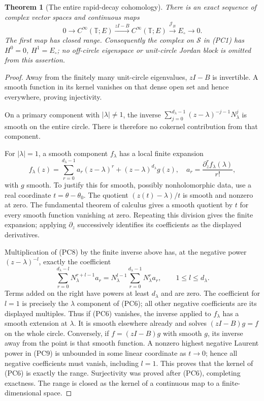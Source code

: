 \documentclass[11pt,a4paper]{article}
\newtheorem{theorem}{Theorem}[section]
\theoremstyle{definition}\newtheorem{definition}[theorem]{Definition}
\begin{document}
\begin{theorem}[The entire rapid-decay cohomology]
\label{thm:rapid-prime-cohomology}
There is an exact sequence of complex vector spaces and continuous maps
\[
 0\longrightarrow C^\infty(\mathbb T;E)
 \xrightarrow{zI-B} C^\infty(\mathbb T;E)
 \xrightarrow{\mathcal J_B}E_\circ\longrightarrow0.
 \tag{PC7}
\]
The first map has closed range. Consequently the complex on
$\mathscr S$ in (PC1) has $H^0=0$, $H^1=E_\circ$; no off-circle
eigenspace or unit-circle Jordan block is omitted from this assertion.
\end{theorem}
\begin{proof}
Away from the finitely many unit-circle eigenvalues, $zI-B$ is
invertible. A smooth function in its kernel vanishes on that dense
open set and hence everywhere, proving injectivity.

On a primary component with $|\lambda|\ne1$, the inverse
$\sum_{j=0}^{d_\lambda-1}(z-\lambda)^{-j-1}N_\lambda^j$
is smooth on the entire circle. There is therefore no cokernel
contribution from that component.

For $|\lambda|=1$, a smooth component $f_\lambda$ has a local finite
expansion
\[
 f_\lambda(z)=\sum_{r=0}^{d_\lambda-1}a_r(z-\lambda)^r
           +(z-\lambda)^{d_\lambda}g(z),
 \quad a_r=\frac{\partial_z^rf_\lambda(\lambda)}{r!},
 \tag{PC8}
\]
with $g$ smooth. To justify this for smooth, possibly nonholomorphic
data, use a real coordinate $t=\theta-\theta_0$. The quotient
$(z(t)-\lambda)/t$ is smooth and nonzero at zero. The fundamental
theorem of calculus gives a smooth quotient by $t$ for every smooth
function vanishing at zero. Repeating this division gives the finite
expansion; applying $\partial_z$ successively identifies its
coefficients as the displayed derivatives.

Multiplication of (PC8) by the finite inverse above has, at the
negative power $(z-\lambda)^{-l}$, exactly the coefficient
\[
 \sum_{r=0}^{d_\lambda-l}N_\lambda^{r+l-1}a_r
  =N_\lambda^{l-1}\sum_{r=0}^{d_\lambda-1}N_\lambda^r a_r,
 \qquad 1\le l\le d_\lambda.
 \tag{PC9}
\]
Terms added on the right have powers at least $d_\lambda$ and are
zero. The coefficient for $l=1$ is precisely the $\lambda$ component
of (PC6); all other negative coefficients are its displayed multiples.
Thus if (PC6) vanishes, the inverse applied to $f_\lambda$ has a
smooth extension at $\lambda$. It is smooth elsewhere already and
solves $(zI-B)g=f$ on the whole circle. Conversely, if $f=(zI-B)g$
with smooth $g$, its inverse away from the point is that smooth
function. A nonzero highest negative Laurent power in (PC9) is
unbounded in some linear coordinate as $t\to0$; hence all negative
coefficients must vanish, including $l=1$. This proves that the
kernel of (PC6) is exactly the range. Surjectivity was proved after
(PC6), completing exactness. The range is closed as the kernel of a
continuous map to a finite-dimensional space.
\end{proof}
\end{document}
